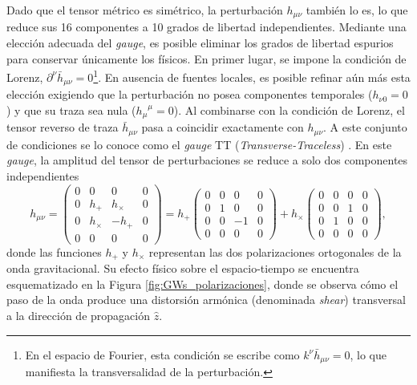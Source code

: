 Dado que el tensor métrico es simétrico, la perturbación $h_{\mu\nu}$ también lo es, lo que reduce sus 16 componentes a 10 grados de libertad independientes. Mediante una elección adecuada del \textit{gauge}, es posible eliminar los grados de libertad espurios para conservar únicamente los físicos. En primer lugar, se impone la condición de Lorenz, $\partial^\nu \bar{h}_{\mu\nu} = 0$\footnote{En el espacio de Fourier, esta condición se escribe como $k^\nu \bar{h}_{\mu \nu} = 0$, lo que manifiesta la transversalidad de la perturbación.}. En ausencia de fuentes locales, es posible refinar aún más esta elección exigiendo que la perturbación no posea componentes temporales ($h_{\nu 0} = 0$) y que su traza sea nula (${h_\mu}^\mu = 0$). Al combinarse con la condición de Lorenz, el tensor reverso de traza $\bar{h}_{\mu\nu}$ pasa a coincidir exactamente con $h_{\mu\nu}$. A este conjunto de condiciones se lo conoce como el \textit{gauge} TT (\textit{Transverse-Traceless}) \cite{Caprini_2020, Bethke}. En este \textit{gauge}, la amplitud del tensor de perturbaciones se reduce a solo dos componentes independientes
\begin{equation}
    h_{\mu\nu} = \begin{pmatrix}
        0 & 0 & 0 & 0\\
        0 & h_+ & h_\times & 0\\
        0 & h_\times & - h_+ & 0\\
        0 & 0 & 0 & 0
    \end{pmatrix} = h_+ \begin{pmatrix}
        0 & 0 & 0 & 0\\
        0 & 1 & 0 & 0\\
        0 & 0 & -1 & 0\\
        0 & 0 & 0 & 0
    \end{pmatrix} + h_\times \begin{pmatrix}
        0 & 0 & 0 & 0\\
        0 & 0 & 1 & 0\\
        0 & 1 & 0 & 0\\
        0 & 0 & 0 & 0
    \end{pmatrix},
\end{equation}
donde las funciones $h_+$ y $h_\times$ representan las dos polarizaciones ortogonales de la onda gravitacional. Su efecto físico sobre el espacio-tiempo se encuentra esquematizado en la Figura \ref{fig:GWs_polarizaciones}, donde se observa cómo el paso de la onda produce una distorsión armónica (denominada \textit{shear}) transversal a la dirección de propagación $\hat{z}$.

